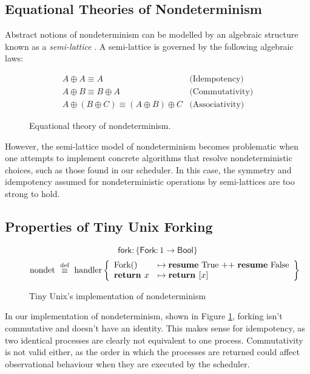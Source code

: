 \documentclass[logo,bsc,singlespacing,parskip]{infthesis}
\begin{document}
\subsection{Equational Theories of Nondeterminism}
Abstract notions of nondeterminism can be modelled by an algebraic structure known as a \textit{semi-lattice} \cite{Pretnar:2010}. A semi-lattice is governed by the following algebraic laws:

\begin{figure}[H]
\centering
\[
\begin{array}{ll}
  A \oplus A \equiv A & \text{(Idempotency)} \\
  A \oplus B \equiv B \oplus A & \text{(Commutativity)} \\
  A \oplus (B \oplus C) \equiv (A \oplus B) \oplus C & \text{(Associativity)}
\end{array}
\]
\caption{%
  Equational theory of nondeterminism.
}
\end{figure}



However, the semi-lattice model of nondeterminism becomes problematic when one attempts to implement concrete algorithms that resolve nondeterministic choices, such as those found in our scheduler. In this case, the symmetry and idempotency assumed for nondeterministic operations by semi-lattices are too strong to hold.



\subsection{Properties of Tiny Unix Forking}


\begin{figure}[H]
\centering
\[
\mathsf{fork} : \{ \mathsf{Fork} : 1 \rightarrow \mathsf{Bool} \}
\]
\vspace{-1em}
\[
\text{nondet} \ \overset{\text{def}}{\equiv} \ \text{handler} \left\{
\begin{array}{ll}
\text{Fork}() &\mapsto \text{\textbf{resume} True ++ \textbf{resume} False} \\
\textbf{return } x &\mapsto \textbf{return } [x]
\end{array}
\right\}
\]
\caption{Tiny Unix's implementation of nondeterminism}
\label{nondetImplementation}
\end{figure}


In our implementation of nondeterminism, shown in Figure  \ref{nondetImplementation}, forking isn't commutative and doesn't have an identity. This makes sense for idempotency, as two identical processes are clearly not equivalent to one process. Commutativity is not valid either, as the order in which the processes are returned could affect observational behaviour when they are executed by the scheduler.
\end{document}
